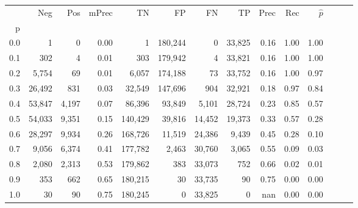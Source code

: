 \begin{tabular}{rrrrrrrrrrrrrr}
\toprule
{} &     Neg &    Pos & mPrec &       TN &       FP &      FN &      TP &  Prec &   Rec & $\hat{p}$ \\
p   &         &        &       &          &          &         &         &       &       &           \\
\midrule
0.0 &       1 &      0 &  0.00 &        1 &  180,244 &       0 &  33,825 &  0.16 &  1.00 &      1.00 \\
0.1 &     302 &      4 &  0.01 &      303 &  179,942 &       4 &  33,821 &  0.16 &  1.00 &      1.00 \\
0.2 &   5,754 &     69 &  0.01 &    6,057 &  174,188 &      73 &  33,752 &  0.16 &  1.00 &      0.97 \\
0.3 &  26,492 &    831 &  0.03 &   32,549 &  147,696 &     904 &  32,921 &  0.18 &  0.97 &      0.84 \\
0.4 &  53,847 &  4,197 &  0.07 &   86,396 &   93,849 &   5,101 &  28,724 &  0.23 &  0.85 &      0.57 \\
0.5 &  54,033 &  9,351 &  0.15 &  140,429 &   39,816 &  14,452 &  19,373 &  0.33 &  0.57 &      0.28 \\
0.6 &  28,297 &  9,934 &  0.26 &  168,726 &   11,519 &  24,386 &   9,439 &  0.45 &  0.28 &      0.10 \\
0.7 &   9,056 &  6,374 &  0.41 &  177,782 &    2,463 &  30,760 &   3,065 &  0.55 &  0.09 &      0.03 \\
0.8 &   2,080 &  2,313 &  0.53 &  179,862 &      383 &  33,073 &     752 &  0.66 &  0.02 &      0.01 \\
0.9 &     353 &    662 &  0.65 &  180,215 &       30 &  33,735 &      90 &  0.75 &  0.00 &      0.00 \\
1.0 &      30 &     90 &  0.75 &  180,245 &        0 &  33,825 &       0 &   nan &  0.00 &      0.00 \\
\bottomrule
\end{tabular}
